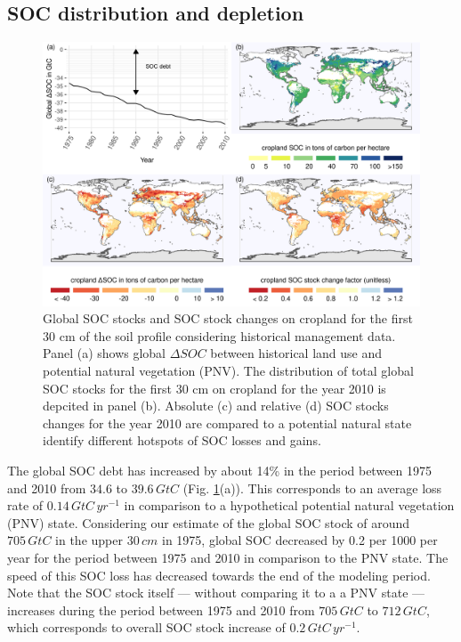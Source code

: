 \documentclass[gc, manuscript]{copernicus}
\begin{document}
\hypertarget{soc-distribution-and-depletion}{%
\subsection{SOC distribution and depletion}\label{soc-distribution-and-depletion}}

\begin{figure}[h]
\includegraphics[width=18cm]{../ResultNotebooks/Output/Images/4panelfigure} \caption{Global SOC stocks and SOC stock changes on cropland for the first 30 cm of the soil profile considering historical management data. Panel (a) shows global $\Delta SOC$ between historical land use and potential natural vegetation (PNV). The distribution of total global SOC stocks for the first 30 cm on cropland for the year 2010 is depcited in panel (b). Absolute (c) and relative (d) SOC stocks changes for the year 2010 are compared to a potential natural state identify different hotspots of SOC losses and gains.}\label{fig:SOCmaps}
\end{figure}

The global SOC debt has increased by about 14\% in the period between 1975 and 2010 from \(34.6\) to \(39.6\,\unit{GtC}\) (Fig. \ref{fig:SOCmaps}(a)). This corresponds to an average loss rate of \(0.14\,\unit{GtC\,yr^{-1}}\) in comparison to a hypothetical potential natural vegetation (PNV) state. Considering our estimate of the global SOC stock of around \(705\,\unit{GtC}\) in the upper \(30\,\unit{cm}\) in 1975, global SOC decreased by 0.2 per 1000 per year for the period between 1975 and 2010 in comparison to the PNV state. The speed of this SOC loss has decreased towards the end of the modeling period.
Note that the SOC stock itself --- without comparing it to a a PNV state --- increases during the period between 1975 and 2010 from \(705\,\unit{GtC}\) to \(712\,\unit{GtC}\), which corresponds to overall SOC stock increase of \(0.2\,\unit{GtC\,yr^{-1}}\).
\end{document}
